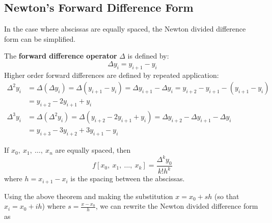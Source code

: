 \documentclass{article}
\begin{document}
\subsection{Newton's Forward Difference Form}
In the case where abscissas are equally spaced, the Newton divided
difference form can be simplified.
\begin{definition}
    The \textbf{forward difference operator} \(\Delta\) is defined by:
    \begin{equation*}
        \Delta y_i = y_{i + 1} - y_i
    \end{equation*}
    Higher order forward differences are defined by repeated application:
    \begin{align*}
        \Delta^2 y_i & = \Delta \left( \Delta y_i \right) = \Delta \left( y_{i + 1} - y_i \right) = \Delta y_{i + 1} - \Delta y_i = y_{i + 2} - y_{i + 1} - \left( y_{i + 1} - y_i \right) \\
                     & = y_{i + 2} - 2y_{i + 1} + y_i                                                                                                                                      \\
        \Delta^3 y_i & = \Delta \left( \Delta^2 y_i \right) = \Delta \left( y_{i + 2} - 2y_{i + 1} + y_i \right) = \Delta y_{i + 2} - \Delta y_{i + 1} - \Delta y_i                        \\
                     & = y_{i + 3} - 3y_{i + 2} + 3y_{i + 1} - y_i
    \end{align*}
\end{definition}
\begin{theorem}
    If \(x_0,\: x_1,\: \dots,\: x_n\) are equally spaced, then
    \begin{equation*}
        f\left[ x_0,\: x_1,\: \dots,\: x_k \right] = \frac{\Delta^k y_0}{k! h^k}
    \end{equation*}
    where \(h = x_{i + 1} - x_i\) is the spacing between the abscissas.
\end{theorem}
Using the above theorem and making the substitution \(x = x_0 + sh\)
(so that \(x_i = x_0 + ih\)) where \(s = \frac{x - x_0}{h}\), we can
rewrite the Newton divided difference form as
\end{document}
